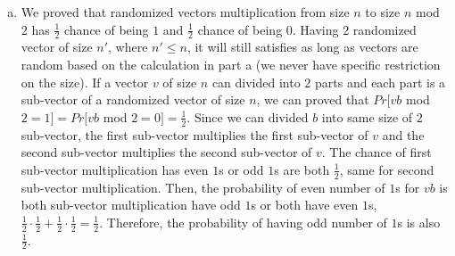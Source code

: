 \documentclass[11pt]{article}
\begin{document}
\begin{solution}
\begin{enumerate}[(a)]
    \newline
    \item 
    We proved that randomized vectors multiplication from size $n$ to size $n$ mod $2$ has $\frac {1}{2}$ chance of being $1$ and $\frac {1}{2}$ chance of being $0$. Having 2 randomized vector of size $n'$, where $n' \leq n$, it will still satisfies as long as vectors are random based on the calculation in part a (we never have specific restriction on the size). 
    \newline
    \newline
    If a vector $v$ of size $n$ can divided into $2$ parts and each part is a sub-vector of a randomized vector of size $n$, we can proved that $Pr[vb$ mod $2=1] = Pr[vb$ mod $2= 0] =  \frac{1}{2}$. Since we can divided $b$ into same size of $2$ sub-vector, the first sub-vector multiplies the first sub-vector of $v$ and the second sub-vector multiplies the second sub-vector of $v$. The chance of first sub-vector multiplication has even $1$s or odd $1$s are both $\frac{1}{2}$, same for second sub-vector multiplication. Then, the probability of even number of $1$s for $vb$ is both sub-vector multiplication have odd $1$s or both have even $1$s, $\frac{1}{2}\cdot \frac{1}{2} + \frac{1}{2}\cdot \frac{1}{2} = \frac{1}{2}$. Therefore, the probability of having odd number of $1$s is also $\frac{1}{2}$. 
    

\end{enumerate}
\end{solution}
\end{document}

